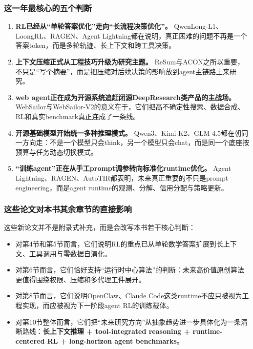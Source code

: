 \documentclass[12pt,a4paper]{article}
\begin{document}
\subsubsection{这一年最核心的五个判断}

\begin{enumerate}
    \item \textbf{RL已经从“单轮答案优化”走向“长流程决策优化”。} QwenLong-L1、LoongRL、RAGEN、Agent Lightning都在说明，真正困难的问题不再是一个答案token，而是多轮轨迹、长上下文和跨工具决策。
    \item \textbf{上下文压缩正式从工程技巧升级为研究主题。} ReSum与ACON之所以重要，不只是“写个摘要”，而是把压缩对后续决策的影响放到agent主链路上来研究。
    \item \textbf{web agent正在成为开源系统追赶闭源DeepResearch类产品的主战场。} WebSailor与WebSailor-V2的意义在于，它们把高不确定性搜索、数据合成、RL和真实benchmark真正连成了一条线。
    \item \textbf{开源基础模型开始统一多种推理模式。} Qwen3、Kimi K2、GLM-4.5都在朝同一方向走：不是一个模型只会think，另一个模型只会chat，而是同一个底座按预算与任务动态切换模式。
    \item \textbf{“训练agent”正在从手工prompt调参转向标准化runtime优化。} Agent Lightning、RAGEN、AutoTIR都表明，未来真正重要的不只是prompt engineering，而是agent runtime的观测、分解、信用分配与策略更新。
\end{enumerate}

\subsubsection{这些论文对本书其余章节的直接影响}

这些新论文并不是附录式补充，而是会改写本书若干核心判断：

\begin{itemize}
    \item 对第4节和第5节而言，它们说明RL的重点已从单轮数学答案扩展到长上下文、工具调用与零数据自演化。
    \item 对第6节而言，它们恰好支持“运行时中心算法”的判断：未来高价值原创算法更值得围绕权限、压缩和多代理工件展开。
    \item 对第8节而言，它们说明OpenClaw、Claude Code这类runtime不应只被视为工程实现，而应被视为下一阶段agent RL的训练载体。
    \item 对第10节整体而言，它们把“未来研究方向”从抽象趋势进一步具体化为一条清晰路线：\textbf{长上下文推理 + tool-integrated reasoning + runtime-centered RL + long-horizon agent benchmarks}。
\end{itemize}
\end{document}
